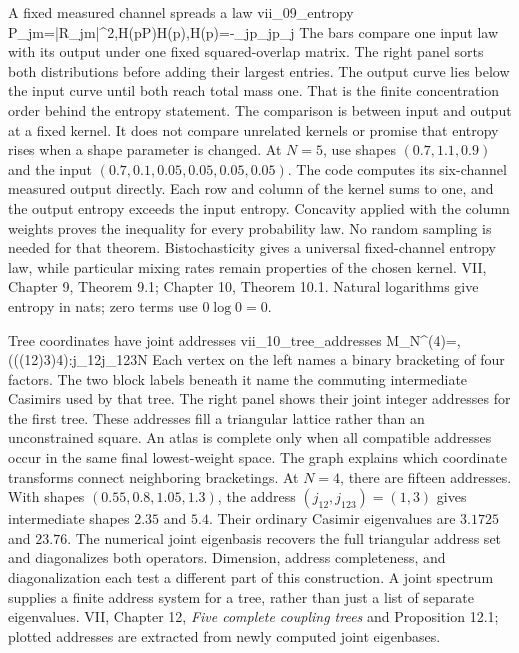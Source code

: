 {A fixed measured channel spreads a law}
{vii_09_entropy}
{P_{jm}=|\mathcal R_{jm}|^2,\qquad H(pP)\geq H(p),\qquad H(p)=-\sum_jp_j\log p_j}
{The bars compare one input law with its output under one fixed squared-overlap matrix. The right panel sorts both distributions before adding their largest entries. The output curve lies below the input curve until both reach total mass one. That is the finite concentration order behind the entropy statement. The comparison is between input and output at a fixed kernel. It does not compare unrelated kernels or promise that entropy rises when a shape parameter is changed.}
{At $N=5$, use shapes $(0.7,1.1,0.9)$ and the input $(0.7,0.1,0.05,0.05,0.05,0.05)$. The code computes its six-channel measured output directly. Each row and column of the kernel sums to one, and the output entropy exceeds the input entropy. Concavity applied with the column weights proves the inequality for every probability law. No random sampling is needed for that theorem.}
{Bistochasticity gives a universal fixed-channel entropy law, while particular mixing rates remain properties of the chosen kernel.}
{VII, Chapter 9, Theorem 9.1; Chapter 10, Theorem 10.1. Natural logarithms give entropy in nats; zero terms use $0\log0=0$.}

{Tree coordinates have joint addresses}
{vii_10_tree_addresses}
{\dim M_N^{(4)}=,\qquad (((12)3)4):\leq j_{12}\leq j_{123}\leq N}
{Each vertex on the left names a binary bracketing of four factors. The two block labels beneath it name the commuting intermediate Casimirs used by that tree. The right panel shows their joint integer addresses for the first tree. These addresses fill a triangular lattice rather than an unconstrained square. An atlas is complete only when all compatible addresses occur in the same final lowest-weight space. The graph explains which coordinate transforms connect neighboring bracketings.}
{At $N=4$, there are fifteen addresses. With shapes $(0.55,0.8,1.05,1.3)$, the address $(j_{12},j_{123})=(1,3)$ gives intermediate shapes $2.35$ and $5.4$. Their ordinary Casimir eigenvalues are $3.1725$ and $23.76$. The numerical joint eigenbasis recovers the full triangular address set and diagonalizes both operators. Dimension, address completeness, and diagonalization each test a different part of this construction.}
{A joint spectrum supplies a finite address system for a tree, rather than just a list of separate eigenvalues.}
{VII, Chapter 12, \emph{Five complete coupling trees} and Proposition 12.1; plotted addresses are extracted from newly computed joint eigenbases.}

